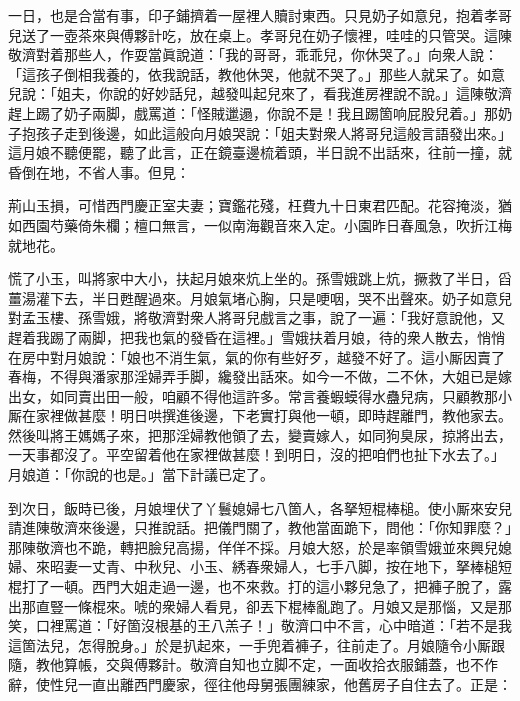 一日，也是合當有事，印子鋪擠着一屋裡人贖討東西。只見奶子如意兒，抱着孝哥兒送了一壺茶來與傅夥計吃，放在桌上。孝哥兒在奶子懷裡，哇哇的只管哭。這陳敬濟對着那些人，作耍當眞說道：「我的哥哥，乖乖兒，你休哭了。」向衆人說：「這孩子倒相我養的，依我說話，教他休哭，他就不哭了。」{}那些人就呆了。如意兒說：「姐夫，你說的好妙話兒，越發叫起兒來了，看我進房裡說不說。」這陳敬濟趕上踢了奶子兩脚，戲罵道：「怪賊邋遢，你說不是！我且踢箇响屁股兒着。」{}那奶子抱孩子走到後邊，如此這般向月娘哭說：「姐夫對衆人將哥兒這般言語發出來。」這月娘不聽便罷，聽了此言，正在鏡臺邊梳着頭，半日說不出話來，往前一撞，就昏倒在地，不省人事。但見：

\begin{myquote}
荊山玉損，可惜西門慶正室夫妻；寶鑑花殘，枉費九十日東君匹配。花容掩淡，猶如西園芍藥倚朱欄；檀口無言，一似南海觀音來入定。小園昨日春風急，吹折江梅就地花。
\end{myquote}

慌了小玉，叫將家中大小，扶起月娘來炕上坐的。孫雪娥跳上炕，撅救了半日，舀薑湯灌下去，半日甦醒過來。月娘氣堵心胸，只是哽咽，哭不出聲來。奶子如意兒對孟玉樓、孫雪娥，將敬濟對衆人將哥兒戲言之事，說了一遍：「我好意說他，又趕着我踢了兩脚，把我也氣的發昏在這裡。」雪娥扶着月娘，待的衆人散去，悄悄在房中對月娘說：「娘也不消生氣，氣的你有些好歹，越發不好了。這小厮因賣了春梅，不得與潘家那淫婦弄手脚，纔發出話來。如今一不做，二不休，大姐已是嫁出女，如同賣出田一般，咱顧不得他這許多。常言養蝦蟆得水蠱兒病，只顧教那小厮在家裡做甚麼！明日哄撰進後邊，下老實打與他一頓，即時趕離門，教他家去。然後叫將王媽媽子來，把那淫婦教他領了去，變賣嫁人，如同狗臭尿，掠將出去，一天事都沒了。平空留着他在家裡做甚麼！到明日，沒的把咱們也扯下水去了。」{}月娘道：「你說的也是。」當下計議已定了。

到次日，飯時已後，月娘埋伏了丫鬟媳婦七八箇人，各拏短棍棒槌。使小厮來安兒請進陳敬濟來後邊，只推說話。把儀門關了，教他當面跪下，問他：「你知罪麼？」那陳敬濟也不跪，轉把臉兒高揚，佯佯不採。月娘大怒，於是率領雪娥並來興兒媳婦、來昭妻一丈青、中秋兒、小玉、綉春衆婦人，七手八脚，按在地下，拏棒槌短棍打了一頓。西門大姐走過一邊，也不來救。打的這小夥兒急了，把褲子脫了，露出那直豎一條棍來。{}唬的衆婦人看見，卻丟下棍棒亂跑了。月娘又是那惱，又是那笑，口裡罵道：「好箇沒根基的王八羔子！」敬濟口中不言，心中暗道：「若不是我這箇法兒，怎得脫身。」於是扒起來，一手兜着褲子，往前走了。月娘隨令小厮跟隨，教他算帳，交與傅夥計。敬濟自知也立脚不定，一面收拾衣服鋪蓋，也不作辭，使性兒一直出離西門慶家，徑往他母舅張團練家，他舊房子自住去了。正是：

